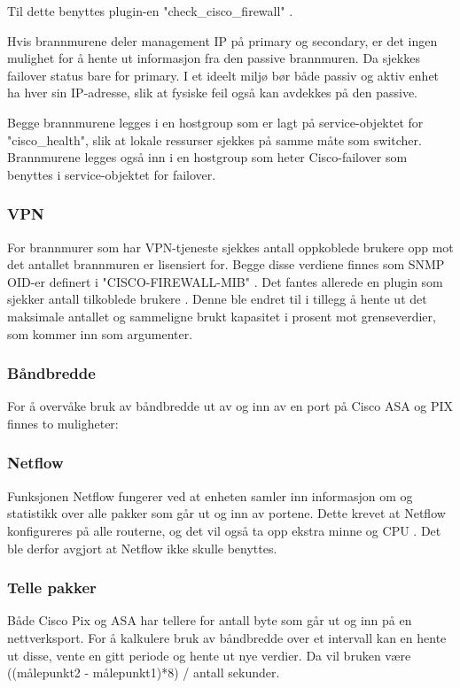 Til dette benyttes plugin-en "check\_cisco\_firewall" \cite{checkciscofirewall}.

Hvis brannmurene deler management IP på primary og secondary, er det ingen mulighet for å hente ut informasjon fra den passive brannmuren. Da sjekkes failover status bare for primary. I et ideelt miljø bør både passiv og aktiv enhet ha hver sin IP-adresse, slik at fysiske feil også kan avdekkes på den passive.

Begge brannmurene legges i en hostgroup som er lagt på service-objektet for "cisco\_health", slik at lokale ressurser sjekkes på samme måte som switcher. Brannmurene legges også inn i en hostgroup som heter Cisco-failover som benyttes i service-objektet for failover.

\subsubsection{VPN}
For brannmurer som har VPN-tjeneste sjekkes antall oppkoblede brukere opp mot det antallet brannmuren er lisensiert for. Begge disse verdiene finnes som SNMP OID-er definert i "CISCO-FIREWALL-MIB" \cite{cisco_fw_mib}. Det fantes allerede en plugin som sjekker antall tilkoblede brukere \cite{checkciscovpn}. Denne ble endret til i tillegg å hente ut det maksimale antallet og sammeligne brukt kapasitet i prosent mot grenseverdier, som kommer inn som argumenter.

\subsubsection{Båndbredde}
For å overvåke bruk av båndbredde ut av og inn av en port på Cisco ASA og PIX finnes to muligheter:

\subsubsection*{Netflow}
Funksjonen Netflow \cite{ciscoiosnetflow} fungerer ved at enheten samler inn informasjon om og statistikk over alle pakker som går ut og inn av portene. Dette krevet at Netflow konfigureres på alle routerne, og det vil også ta opp ekstra minne og CPU \cite{cisconetflowperf}. Det ble derfor avgjort at Netflow ikke skulle benyttes.

\subsubsection*{Telle pakker}
Både Cisco Pix og ASA har tellere for antall byte som går ut og inn på en nettverksport. For å kalkulere bruk av båndbredde over et intervall kan en hente ut disse, vente en gitt periode og hente ut nye verdier. Da vil bruken være ((målepunkt2 - målepunkt1)*8) / antall sekunder.


